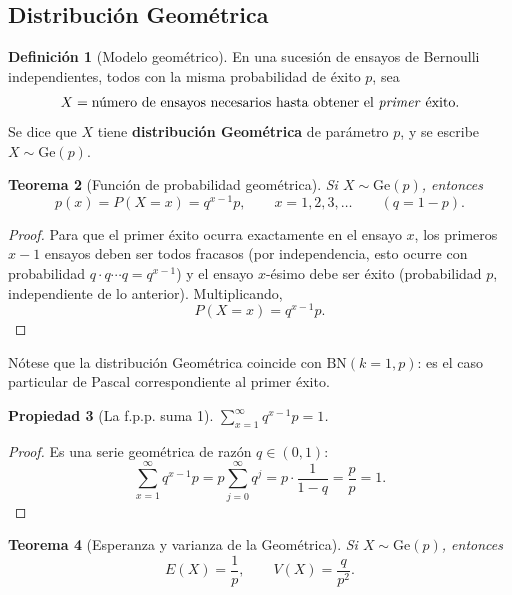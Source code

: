 \documentclass[11pt,a4paper]{article}
\theoremstyle{plain}
\newtheorem{teorema}{Teorema}[section]
\newtheorem{propiedad}[teorema]{Propiedad}
\theoremstyle{definition}
\newtheorem{definicion}[teorema]{Definición}
\theoremstyle{remark}
\begin{document}
\subsection{Distribución Geométrica}\label{sec:geometrica}

\begin{definicion}[Modelo geométrico]
En una sucesión de ensayos de Bernoulli independientes, todos con la misma probabilidad de éxito $p$, sea
$$X=\text{número de ensayos necesarios hasta obtener el \emph{primer} éxito}.$$
Se dice que $X$ tiene \textbf{distribución Geométrica} de parámetro $p$, y se escribe $X\sim\text{Ge}(p)$.
\end{definicion}

\begin{teorema}[Función de probabilidad geométrica]
Si $X\sim\text{Ge}(p)$, entonces
$$p(x)=P(X=x)=q^{x-1}p,\qquad x=1,2,3,\dots\qquad(q=1-p).$$
\end{teorema}
\begin{proof}
Para que el primer éxito ocurra exactamente en el ensayo $x$, los primeros $x-1$ ensayos deben ser todos fracasos (por independencia, esto ocurre con probabilidad $q\cdot q\cdots q=q^{x-1}$) y el ensayo $x$-ésimo debe ser éxito (probabilidad $p$, independiente de lo anterior). Multiplicando,
$$P(X=x)=q^{x-1}p.$$
\end{proof}

Nótese que la distribución Geométrica coincide con $\text{BN}(k=1,p)$: es el caso particular de Pascal correspondiente al primer éxito.

\begin{propiedad}[La f.p.p. suma 1]
$\displaystyle\sum_{x=1}^\infty q^{x-1}p=1$.
\end{propiedad}
\begin{proof}
Es una serie geométrica de razón $q\in(0,1)$:
$$\sum_{x=1}^\infty q^{x-1}p=p\sum_{j=0}^\infty q^j=p\cdot\frac{1}{1-q}=\frac{p}{p}=1.$$
\end{proof}

\begin{teorema}[Esperanza y varianza de la Geométrica]\label{thm:geomEV}
Si $X\sim\text{Ge}(p)$, entonces
$$E(X)=\frac1p,\qquad V(X)=\frac{q}{p^2}.$$
\end{teorema}
\end{document}

